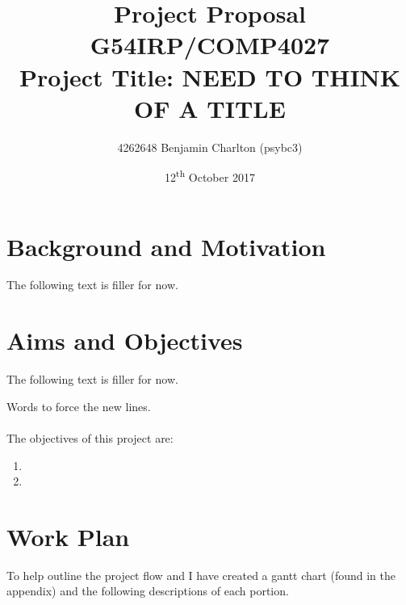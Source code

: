 \documentclass[a4paper]{article}
\begin{document}
\title{
    Project Proposal
    \\ \large{G54IRP/COMP4027}
    \\ \large{Project Title: NEED TO THINK OF A TITLE}\vspace{-3ex}}
\author{4262648 Benjamin Charlton (psybc3)}
\date{\vspace{-2ex}12\textsuperscript{th} October 2017}
\maketitle

\section{Background and Motivation}
The following text is filler for now.
\par
\lipsum[1-7]

\section{Aims and Objectives}
The following text is filler for now.
\par
\lipsum[1-5] Words to force the new lines.
\\ \\
The objectives of this project are:
\begin{enumerate}
    \item \lipsum[1]
    \item \lipsum[1]
\end{enumerate}

\section{Work Plan}
To help outline the project flow and I have created a gantt chart (found in the appendix) and the following descriptions of each portion.
\end{document}
